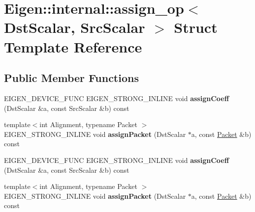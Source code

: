 \hypertarget{struct_eigen_1_1internal_1_1assign__op}{}\section{Eigen\+:\+:internal\+:\+:assign\+\_\+op$<$ Dst\+Scalar, Src\+Scalar $>$ Struct Template Reference}
\label{struct_eigen_1_1internal_1_1assign__op}
\subsection*{Public Member Functions}
\begin{DoxyCompactItemize}
\item 
\mbox{\label{struct_eigen_1_1internal_1_1assign__op_a3ebf383597f27cf667e1819811240a5f}} 
E\+I\+G\+E\+N\+\_\+\+D\+E\+V\+I\+C\+E\+\_\+\+F\+U\+NC E\+I\+G\+E\+N\+\_\+\+S\+T\+R\+O\+N\+G\+\_\+\+I\+N\+L\+I\+NE void {\bfseries assign\+Coeff} (Dst\+Scalar \&a, const Src\+Scalar \&b) const
\item 
\mbox{\label{struct_eigen_1_1internal_1_1assign__op_a692298cacb98ec36a00dadbc36824699}} 
{\footnotesize template$<$int Alignment, typename Packet $>$ }\\E\+I\+G\+E\+N\+\_\+\+S\+T\+R\+O\+N\+G\+\_\+\+I\+N\+L\+I\+NE void {\bfseries assign\+Packet} (Dst\+Scalar $\ast$a, const \hyperlink{union_eigen_1_1internal_1_1_packet}{Packet} \&b) const
\item 
\mbox{\label{struct_eigen_1_1internal_1_1assign__op_a3ebf383597f27cf667e1819811240a5f}} 
E\+I\+G\+E\+N\+\_\+\+D\+E\+V\+I\+C\+E\+\_\+\+F\+U\+NC E\+I\+G\+E\+N\+\_\+\+S\+T\+R\+O\+N\+G\+\_\+\+I\+N\+L\+I\+NE void {\bfseries assign\+Coeff} (Dst\+Scalar \&a, const Src\+Scalar \&b) const
\item 
\mbox{\label{struct_eigen_1_1internal_1_1assign__op_a692298cacb98ec36a00dadbc36824699}} 
{\footnotesize template$<$int Alignment, typename Packet $>$ }\\E\+I\+G\+E\+N\+\_\+\+S\+T\+R\+O\+N\+G\+\_\+\+I\+N\+L\+I\+NE void {\bfseries assign\+Packet} (Dst\+Scalar $\ast$a, const \hyperlink{union_eigen_1_1internal_1_1_packet}{Packet} \&b) const
\end{DoxyCompactItemize}


